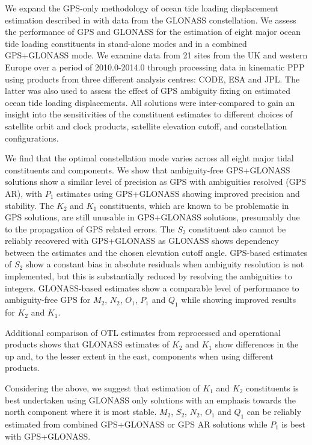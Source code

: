 \documentclass[se, manuscript]{copernicus}
\begin{document}
\conclusions %
We expand the GPS-only methodology of ocean tide loading displacement estimation described in \cite{Penna2015} with data from the GLONASS constellation. We assess the performance of GPS and GLONASS for the estimation of eight major ocean tide loading constituents in stand-alone modes and in a combined GPS+GLONASS mode. We examine data from 21 sites from the UK and western Europe over a period of 2010.0-2014.0 through processing data in kinematic PPP using products from three different analysis centres: CODE, ESA and JPL. The latter was also used to assess the effect of GPS ambiguity fixing on estimated ocean tide loading displacements. All solutions were inter-compared to gain an insight into the sensitivities of the constituent estimates to different choices of satellite orbit and clock products, satellite elevation cutoff, and constellation configurations.

We find that the optimal constellation mode varies across all eight major tidal constituents and components. We show that ambiguity-free GPS+GLONASS solutions show a similar level of precision as GPS with ambiguities resolved (GPS AR), with $P_1$ estimates using GPS+GLONASS showing improved precision and stability. The $K_2$ and $K_1$ constituents, which are known to be problematic in GPS solutions, are still unusable in GPS+GLONASS solutions, presumably due to the propagation of GPS related errors. The $S_2$ constituent also cannot be reliably recovered with GPS+GLONASS as GLONASS shows dependency between the estimates and the chosen elevation cutoff angle. GPS-based estimates of $S_2$ show a constant bias in absolute residuals when ambiguity resolution is not implemented, but this is substantially reduced by resolving the ambiguities to integers. GLONASS-based estimates show a comparable level of performance to ambiguity-free GPS for $M_2$, $N_2$, $O_1$, $P_1$ and $Q_1$ while showing improved results for $K_2$ and $K_1$.

Additional comparison of OTL estimates from reprocessed and operational products shows that GLONASS estimates of $K_2$ and $K_1$ show differences in the up and, to the lesser extent in the east, components when using different products.

Considering the above, we suggest that estimation of $K_1$ and $K_2$ constituents is best undertaken using GLONASS only solutions with an emphasis towards the north component where it is most stable. $M_2$, $S_2$, $N_2$, $O_1$ and $Q_1$ can be reliably estimated from combined GPS+GLONASS or GPS AR solutions while $P_1$ is best with GPS+GLONASS.
\end{document}
